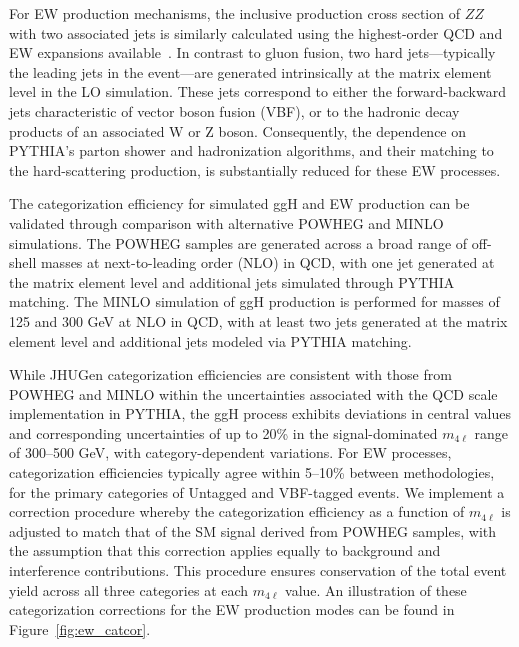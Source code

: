 For EW production mechanisms, the inclusive production cross section of $ZZ$ with two associated jets is similarly calculated using the highest-order QCD and EW expansions available~\cite{deFlorian:2016spz}. 
In contrast to gluon fusion, two hard jets—typically the leading jets in the event—are generated intrinsically at the matrix element level in the LO simulation. 
These jets correspond to either the forward-backward jets characteristic of vector boson fusion (VBF), or to the hadronic decay products of an associated W or Z boson. 
Consequently, the dependence on PYTHIA's parton shower and hadronization algorithms, and their matching to the hard-scattering production, is substantially reduced for these EW processes.

The categorization efficiency for simulated ggH and EW \Hboson production can be validated through comparison with alternative POWHEG and MINLO simulations. 
The POWHEG samples are generated across a broad range of off-shell \Hboson masses at next-to-leading order (NLO) in QCD, with one jet generated at the matrix element level and additional jets simulated through PYTHIA matching. 
The MINLO simulation of ggH production is performed for \Hboson masses of 125 and $300$ GeV at NLO in QCD, with at least two jets generated at the matrix element level and additional jets modeled via PYTHIA matching.

While JHUGen categorization efficiencies are consistent with those from POWHEG and MINLO within the uncertainties associated with the QCD scale implementation in PYTHIA,
the ggH process exhibits deviations in central values and corresponding uncertainties of up to 20\% in the signal-dominated $m_{4\ell}$ range of 300--500 GeV, with category-dependent variations. 
For EW processes, categorization efficiencies typically agree within 5--10\% between methodologies, for the primary categories of Untagged and VBF-tagged events.
We implement a correction procedure whereby the categorization efficiency as a function of $m_{4\ell}$ is adjusted to match that of the SM signal derived from POWHEG samples, with the assumption that this correction applies equally to background and interference contributions. 
This procedure ensures conservation of the total event yield across all three categories at each $m_{4\ell}$ value. An illustration of these categorization corrections for the EW production modes can be found in Figure~\ref{fig:ew_catcor}.

